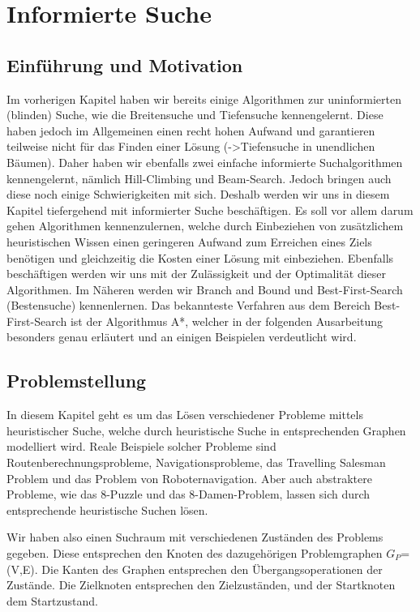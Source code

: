 
\chapter{Informierte Suche}

\section{Einf\"uhrung und Motivation}
Im vorherigen Kapitel haben wir bereits einige Algorithmen zur uninformierten (\glqq blinden\grqq) Suche, wie die Breitensuche und Tiefensuche kennengelernt. Diese haben jedoch im Allgemeinen einen recht hohen Aufwand und garantieren teilweise nicht für das Finden einer Lösung (->Tiefensuche in unendlichen Bäumen). Daher haben wir ebenfalls zwei einfache informierte Suchalgorithmen kennengelernt, nämlich Hill-Climbing und Beam-Search. Jedoch bringen auch diese noch einige Schwierigkeiten mit sich.
Deshalb werden wir uns in diesem Kapitel tiefergehend mit informierter Suche beschäftigen.
Es soll vor allem darum gehen Algorithmen kennenzulernen, welche durch Einbeziehen von zusätzlichem heuristischen Wissen einen geringeren Aufwand zum Erreichen eines Ziels benötigen und gleichzeitig die Kosten einer Lösung mit einbeziehen.
Ebenfalls beschäftigen werden wir uns mit der Zulässigkeit und der Optimalität dieser Algorithmen.
Im Näheren werden wir Branch and Bound und Best-First-Search (Bestensuche) kennenlernen. Das bekannteste Verfahren aus dem Bereich Best-First-Search ist der Algorithmus A*, welcher in der folgenden Ausarbeitung besonders genau erläutert und an einigen Beispielen verdeutlicht wird.



\section{Problemstellung}

In diesem Kapitel geht es um das Lösen verschiedener Probleme mittels heuristischer Suche, welche durch heuristische Suche in entsprechenden Graphen modelliert wird.
Reale Beispiele solcher Probleme sind Routenberechnungsprobleme, Navigationsprobleme, das Travelling Salesman Problem und das Problem von Roboternavigation. Aber auch abstraktere Probleme, wie das 8-Puzzle und das 8-Damen-Problem, lassen sich durch entsprechende heuristische Suchen lösen.

Wir haben also einen Suchraum mit verschiedenen Zuständen des Problems gegeben. Diese entsprechen den Knoten des dazugehörigen Problemgraphen $G_{P}$=(V,E).
Die Kanten des Graphen entsprechen den Übergangsoperationen der Zustände.
Die Zielknoten entsprechen den Zielzuständen, und der Startknoten dem Startzustand.

